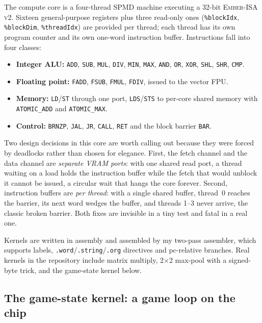 \documentclass[conference]{IEEEtran}
\begin{document}
The compute core is a four-thread SPMD machine executing a 32-bit
\textsc{Ember-ISA v2}. Sixteen general-purpose registers plus three read-only
ones (\texttt{\%blockIdx}, \texttt{\%blockDim}, \texttt{\%threadIdx}) are
provided per thread; each thread has its own program counter and its own
one-word instruction buffer. Instructions fall into four classes:

\begin{itemize}
  \item \textbf{Integer ALU:} \texttt{ADD}, \texttt{SUB}, \texttt{MUL},
        \texttt{DIV}, \texttt{MIN}, \texttt{MAX}, \texttt{AND}, \texttt{OR},
        \texttt{XOR}, \texttt{SHL}, \texttt{SHR}, \texttt{CMP}.
  \item \textbf{Floating point:} \texttt{FADD}, \texttt{FSUB}, \texttt{FMUL},
        \texttt{FDIV}, issued to the vector FPU.
  \item \textbf{Memory:} \texttt{LD}/\texttt{ST} through one port,
        \texttt{LDS}/\texttt{STS} to per-core shared memory with
        \texttt{ATOMIC\_ADD} and \texttt{ATOMIC\_MAX}.
  \item \textbf{Control:} \texttt{BRNZP}, \texttt{JAL}, \texttt{JR},
        \texttt{CALL}, \texttt{RET} and the block barrier \texttt{BAR}.
\end{itemize}

Two design decisions in this core are worth calling out because they were
forced by deadlocks rather than chosen for elegance. First, the fetch channel
and the data channel are \emph{separate VRAM ports}: with one shared read port,
a thread waiting on a load holds the instruction buffer while the fetch that
would unblock it cannot be issued, a circular wait that hangs the core
forever. Second, instruction buffers are \emph{per thread}: with a single shared
buffer, thread~0 reaches the barrier, its next word wedges the buffer, and
threads 1--3 never arrive, the classic broken barrier. Both fixes are
invisible in a tiny test and fatal in a real one.

Kernels are written in assembly and assembled by my two-pass assembler, which
supports labels, \texttt{.word}/\texttt{.string}/\texttt{.org} directives and
pc-relative branches. Real kernels in the repository include matrix multiply,
2$\times$2 max-pool with a signed-byte trick, and the game-state kernel below.

\subsection{The game-state kernel: a game loop on the chip}
\end{document}
